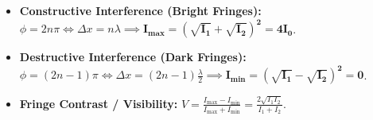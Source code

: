 \documentclass[10pt,a4paper]{article}
\begin{document}
\begin{conceptbox}
\begin{equation}
\end{equation}
\begin{itemize}
  \item \textbf{Constructive Interference (Bright Fringes):} $\phi = 2n\pi \iff \Delta x = n\lambda \implies \mathbf{I_{\max} = (\sqrt{I_1} + \sqrt{I_2})^2 = 4I_0}$.
  \item \textbf{Destructive Interference (Dark Fringes):} $\phi = (2n-1)\pi \iff \Delta x = (2n-1)\frac{\lambda}{2} \implies \mathbf{I_{\min} = (\sqrt{I_1} - \sqrt{I_2})^2 = 0}$.
  \item \textbf{Fringe Contrast / Visibility:} $V = \frac{I_{\max} - I_{\min}}{I_{\max} + I_{\min}} = \frac{2\sqrt{I_1 I_2}}{I_1 + I_2}$.
\end{itemize}
\end{conceptbox}
\end{document}
